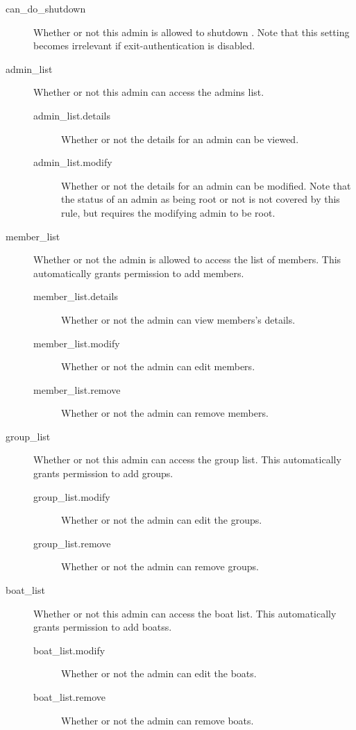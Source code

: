     \begin{description}
        \item [can\_do\_shutdown] Whether or not this admin is allowed to shutdown \srl. Note that this setting becomes irrelevant if exit-authentication is disabled.
        
        \item [admin\_list] Whether or not this admin can access the admins list.
        \begin{description}
            \item [admin\_list.details] Whether or not the details for an admin
                    can be viewed.
            \item [admin\_list.modify] Whether or not the details for an admin
                    can be modified. Note that the status of an admin as being
                    root or not is not covered by this rule, but requires the
                    modifying admin to be root.
        \end{description}
        
        \item [member\_list] Whether or not the admin is allowed to access the list of members. This automatically grants permission to add members.
        \begin{description}
            \item [member\_list.details] Whether or not the admin can view members's details.
            \item [member\_list.modify] Whether or not the admin can edit members.
            \item [member\_list.remove] Whether or not the admin can remove members.
        \end{description}
        
        \item [group\_list] Whether or not this admin can access the group list. This automatically grants permission to add groups.
        \begin{description}
            \item [group\_list.modify] Whether or not the admin can edit the groups.
            \item [group\_list.remove] Whether or not the admin can remove groups.
        \end{description}
        
        \item [boat\_list] Whether or not this admin can access the boat list. This automatically grants permission to add boatss.
        \begin{description}
            \item [boat\_list.modify] Whether or not the admin can edit the boats.
            \item [boat\_list.remove] Whether or not the admin can remove boats.
        \end{description}
    \end{description}